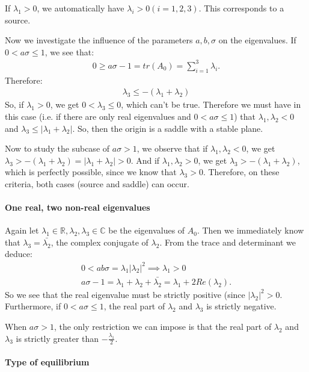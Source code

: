 \message{ !name(chua_circuit.tex)}\documentclass[twocolumn,10pt]{article}
\begin{document}
If $\lambda_1 > 0$, we automatically have $\lambda_i > 0 (i=1,2,3)$.
This corresponds to a source.

Now we investigate the influence of the parameters $a,b,\sigma$ on the
eigenvalues.  If $0 < a\sigma \leq 1$, we see that:
\begin{gather*}
  0 \geq a\sigma - 1 = tr(A_0) = \sum_{i=1}^3 \lambda_i.
\end{gather*}
Therefore:
\begin{gather*}
  \lambda_3 \leq -(\lambda_1 + \lambda_2)
\end{gather*}
So, if $\lambda_1 > 0$, we get $0 < \lambda_3 \leq 0$, which can't be
true.  Therefore we must have in this case (i.e. if there are only
real eigenvalues and $0 < a\sigma \leq 1$) that $\lambda_1,\lambda_2 <
0$ and $\lambda_3 \leq |\lambda_1 + \lambda_2|$.  So, then the origin
is a saddle with a stable plane.

Now to study the subcase of $a\sigma > 1$, we observe that if
$\lambda_1,\lambda_2 < 0$, we get $\lambda_3 > - (\lambda_1 +
\lambda_2) = |\lambda_1 + \lambda_2| > 0$.  And if
$\lambda_1,\lambda_2>0$, we get $\lambda_3 > -(\lambda_1 +
\lambda_2)$, which is perfectly possible, since we know that
$\lambda_3 > 0$.  Therefore, on these criteria, both cases (source and
saddle) can occur.

\paragraph{One real, two non-real eigenvalues}
Again let $\lambda_1\in\mathbb{R}, \lambda_2,\lambda_3\in\mathbb{C}$
be the eigenvalues of $A_0$.  Then we immediately know that $\lambda_3
= \bar{\lambda_2}$, the complex conjugate of $\lambda_2$.  From the
trace and determinant we deduce:
\begin{gather*}
  0 < ab\sigma = \lambda_1 |\lambda_2|^2 \implies \lambda_1 > 0\\
  a\sigma - 1 = \lambda_1 + \lambda_2 + \bar{\lambda_2} 
  = \lambda_1 + 2 Re(\lambda_2).
\end{gather*}
So we see that the real eigenvalue must be strictly positive (since
$|\lambda_2|^2 > 0$. Furthermore, if $0< a\sigma \leq 1$, the real part
of $\lambda_2$ and $\lambda_3$ is strictly negative.

When $a \sigma > 1$, the only restriction we can impose is that the
real part of $\lambda_2$ and $\lambda_3$ is strictly greater than
$-\frac{\lambda_1}{2}$.

\paragraph{Type of equilibrium}
\end{document}
